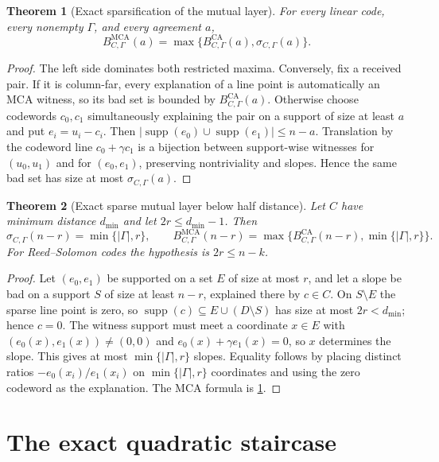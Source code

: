 \documentclass[11pt,a4paper]{amsart}
\numberwithin{equation}{section}
\newtheorem{theorem}{Theorem}[section]
\theoremstyle{remark}
\DeclareMathOperator{\MCA}{MCA}
\DeclareMathOperator{\CA}{CA}
\DeclareMathOperator{\supp}{supp}
\begin{document}
\begin{theorem}[Exact sparsification of the mutual layer]\label{thm:sparsification}
For every linear code, every nonempty $\Gamma$, and every agreement $a$,
\[
 B_{C,\Gamma}^{\MCA}(a)=\max\{B_{C,\Gamma}^{\CA}(a),\sigma_{C,\Gamma}(a)\}.
\]
\end{theorem}

\begin{proof}
The left side dominates both restricted maxima.  Conversely, fix a received pair.  If it is column-far, every explanation of a line point is automatically an MCA witness, so its bad set is bounded by $B_{C,\Gamma}^{\CA}(a)$.  Otherwise choose codewords $c_0,c_1$ simultaneously explaining the pair on a support of size at least $a$ and put $e_i=u_i-c_i$.  Then $|\supp(e_0)\cup\supp(e_1)|\le n-a$.  Translation by the codeword line $c_0+\gamma c_1$ is a bijection between support-wise witnesses for $(u_0,u_1)$ and for $(e_0,e_1)$, preserving nontriviality and slopes.  Hence the same bad set has size at most $\sigma_{C,\Gamma}(a)$.
\end{proof}

\begin{theorem}[Exact sparse mutual layer below half distance]\label{thm:sparse-half}
Let $C$ have minimum distance $d_{\min}$ and let $2r\le d_{\min}-1$.  Then
\[
 \sigma_{C,\Gamma}(n-r)=\min\{|\Gamma|,r\},\qquad
 B_{C,\Gamma}^{\MCA}(n-r)=\max\{B_{C,\Gamma}^{\CA}(n-r),\min\{|\Gamma|,r\}\}.
\]
For Reed--Solomon codes the hypothesis is $2r\le n-k$.
\end{theorem}

\begin{proof}
Let $(e_0,e_1)$ be supported on a set $E$ of size at most $r$, and let a slope be bad on a support $S$ of size at least $n-r$, explained there by $c\in C$.  On $S\setminus E$ the sparse line point is zero, so $\supp(c)\subseteq E\cup(D\setminus S)$ has size at most $2r<d_{\min}$; hence $c=0$.  The witness support must meet a coordinate $x\in E$ with $(e_0(x),e_1(x))\ne(0,0)$ and $e_0(x)+\gamma e_1(x)=0$, so $x$ determines the slope.  This gives at most $\min\{|\Gamma|,r\}$ slopes.  Equality follows by placing distinct ratios $-e_0(x_i)/e_1(x_i)$ on $\min\{|\Gamma|,r\}$ coordinates and using the zero codeword as the explanation.  The MCA formula is \cref{thm:sparsification}.
\end{proof}

\section{The exact quadratic staircase}
\end{document}
